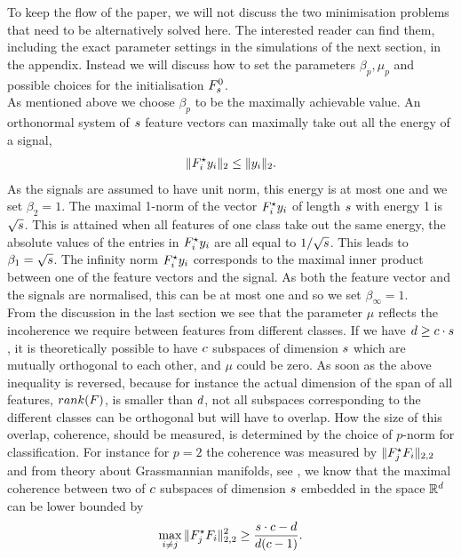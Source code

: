 \documentclass[11pt]{article}
\begin{document}
To keep the flow of the paper, we will not discuss the two minimisation problems that need to be alternatively solved here. The interested reader can find them, including the exact parameter settings in the simulations of the next section, in the appendix. Instead we will discuss how to set the parameters $\beta_p, \mu_p$ and possible choices for the initialisation ${F}_{{s}}^0$.\\
As mentioned above we choose $\beta_p$ to be the maximally achievable value. An orthonormal system of ${s}$ feature vectors can maximally take out all the energy of a signal,
\begin{align}
\|{F}_i^\star {y}_i\|_2 \leq\|{y}_i\|_2.
\end{align}
As the signals are assumed to have unit norm, this energy is at most one and we set $\beta_2=1$. The maximal 1-norm of the vector ${F}_i^\star {y}_i$ of length ${s}$ with energy 1 is $\sqrt{{s}}$. This is attained when all features of one class take out the same energy, \ie the absolute values of the entries in ${F}_i^\star {y}_i$ are all equal to $1/\sqrt{{s}}$. This leads to $\beta_1=\sqrt{{s}}$. The infinity norm ${F}_i^\star {y}_i$ corresponds to the maximal inner product between one of the feature vectors and the signal. As both the feature vector and the signals are normalised, this can be at most one and so we set $\beta_\infty=1$.\\
From the discussion in the last section we see that the parameter $\mu$ reflects the incoherence we require between features from different classes. If we have ${d} \geq {c} \cdot {s}$, it is theoretically possible to have ${c}$ subspaces of dimension ${s}$ which are mutually orthogonal to each other, and $\mu$ could be zero. As soon as the above inequality is reversed, because for instance the actual dimension of the span of all features, \ie $rank({F})$, is smaller than ${d}$, not all subspaces corresponding to the different classes can be orthogonal but will have to overlap. How the size of this overlap, \ie coherence, should be measured, is determined by the choice of $p$-norm for classification. For instance for $p=2$ the coherence was measured by $\|{F}_j^\star {F}_i\|_{2,2}$ and from theory about Grassmannian manifolds, see \cite{trdhhest05}, we know that the maximal coherence between two of ${c}$ subspaces of dimension ${s}$ embedded in the space ${\mathbb{R}}^{d}$ can be lower bounded by
\begin{align}\label{eq:grassbound}
\max_{i\neq j} \|{F}_j^\star {F}_i\|^2_{2,2} \geq \frac{{s}\cdot {c} -{d}}{{d}({c}-1)}.
\end{align}
\end{document}
